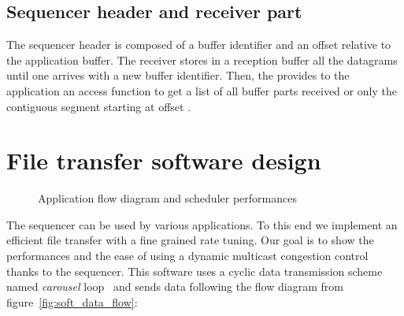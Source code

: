 \documentclass[a4paper]{article}
\begin{document}
    \subsection{Sequencer header and receiver part}
        The sequencer header is composed of a buffer identifier and an offset
        relative to the application buffer. The receiver stores in a reception
        buffer all the datagrams until one arrives with a new buffer identifier.
        Then, the  provides to the application an access function to
        get a list of all buffer parts received or only the contiguous
        segment starting at offset .

\section{File transfer software design}
    \begin{figure}
        \centering
        \caption{Application flow diagram and scheduler performances}
    \end{figure}
    The sequencer can be used by various applications. To this end we implement
    an efficient file transfer with a fine grained rate tuning. Our goal is to
    show the performances and the ease of using a dynamic multicast congestion
    control thanks to the sequencer. This software uses a cyclic data
    transmission scheme named \textit{carousel}
    loop~\cite{peltotalo_performance_2007} and sends data following the flow
    diagram from figure~\ref{fig:soft_data_flow}:
\end{document}
